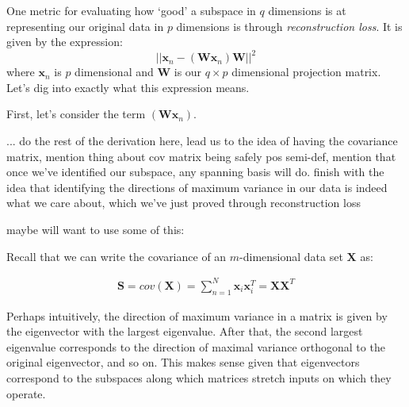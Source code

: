 
One metric for evaluating how `good' a subspace in $q$ dimensions is at representing our original data in $p$ dimensions is through \textit{reconstruction loss}. It is given by the expression:
\begin{equation} \label{reconstruction-loss}
	||\textbf{x}_{n} - (\textbf{W}\textbf{x}_{n})\textbf{W}||^{2}
\end{equation}
where $\textbf{x}_{n}$ is $p$ dimensional and $\textbf{W}$ is our $q \times p$ dimensional projection matrix. Let's dig into exactly what this expression means.

First, let's consider the term $(\textbf{W}\textbf{x}_{n})$.


... do the rest of the derivation here, lead us to the idea of having the covariance matrix, mention thing about cov matrix being safely pos semi-def, mention that once we've identified our subspace, any spanning basis will do. finish with the idea that identifying the directions of maximum variance in our data is indeed what we care about, which we've just proved through reconstruction loss

maybe will want to use some of this:

Recall that we can write the covariance of an $m$-dimensional data set $\textbf{X}$ as:

\begin{align*}
	\textbf{S} = cov(\textbf{X}) = \sum_{n=1}^{N} \textbf{x}_{i} \textbf{x}_{i}^{T} = \textbf{X}\textbf{X}^{T}
\end{align*}


Perhaps intuitively, the direction of maximum variance in a matrix is given by the eigenvector with the largest eigenvalue. After that, the second largest eigenvalue corresponds to the direction of maximal variance orthogonal to the original eigenvector, and so on. This makes sense given that eigenvectors correspond to the subspaces along which matrices stretch inputs on which they operate.

